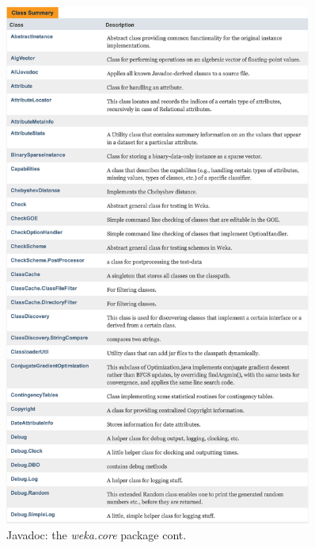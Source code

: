 \begin{figure}[!thp]
\ContinuedFloat
\centering
\includegraphics[width=0.9\textwidth]{images/B5_1b2_1.png}
\caption{Javadoc: the \textit{weka.core} package cont.}
\end{figure}

